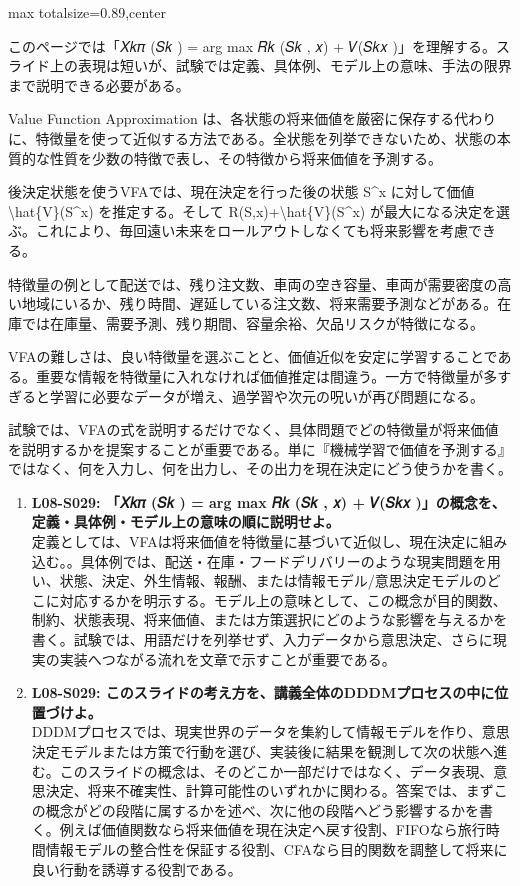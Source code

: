 \begin{minipage}[t]{0.58\textwidth}
\begin{adjustbox}{max totalsize={\textwidth}{0.89\textheight},center}
\begin{minipage}{\textwidth}\scriptsize
{}このページでは「𝑋𝑘𝜋 (𝑆𝑘 ) = arg max 𝑅𝑘 (𝑆𝑘 , 𝑥) + 𝑉(𝑆𝑘𝑥 )」を理解する。スライド上の表現は短いが、試験では定義、具体例、モデル上の意味、手法の限界まで説明できる必要がある。\par
Value Function Approximation は、各状態の将来価値を厳密に保存する代わりに、特徴量を使って近似する方法である。全状態を列挙できないため、状態の本質的な性質を少数の特徴で表し、その特徴から将来価値を予測する。\par
後決定状態を使うVFAでは、現在決定を行った後の状態 S\textasciicircum{}x に対して価値 \textbackslash{}hat\{V\}(S\textasciicircum{}x) を推定する。そして R(S,x)+\textbackslash{}hat\{V\}(S\textasciicircum{}x) が最大になる決定を選ぶ。これにより、毎回遠い未来をロールアウトしなくても将来影響を考慮できる。\par
特徴量の例として配送では、残り注文数、車両の空き容量、車両が需要密度の高い地域にいるか、残り時間、遅延している注文数、将来需要予測などがある。在庫では在庫量、需要予測、残り期間、容量余裕、欠品リスクが特徴になる。\par
VFAの難しさは、良い特徴量を選ぶことと、価値近似を安定に学習することである。重要な情報を特徴量に入れなければ価値推定は間違う。一方で特徴量が多すぎると学習に必要なデータが増え、過学習や次元の呪いが再び問題になる。\par
試験では、VFAの式を説明するだけでなく、具体問題でどの特徴量が将来価値を説明するかを提案することが重要である。単に『機械学習で価値を予測する』ではなく、何を入力し、何を出力し、その出力を現在決定にどう使うかを書く。\par{}\begin{enumerate}\item \textbf{L08-S029: 「𝑋𝑘𝜋 (𝑆𝑘 ) = arg max 𝑅𝑘 (𝑆𝑘 , 𝑥) + 𝑉(𝑆𝑘𝑥 )」の概念を、定義・具体例・モデル上の意味の順に説明せよ。}\\定義としては、VFAは将来価値を特徴量に基づいて近似し、現在決定に組み込む。。具体例では、配送・在庫・フードデリバリーのような現実問題を用い、状態、決定、外生情報、報酬、または情報モデル/意思決定モデルのどこに対応するかを明示する。モデル上の意味として、この概念が目的関数、制約、状態表現、将来価値、または方策選択にどのような影響を与えるかを書く。試験では、用語だけを列挙せず、入力データから意思決定、さらに現実の実装へつながる流れを文章で示すことが重要である。\item \textbf{L08-S029: このスライドの考え方を、講義全体のDDDMプロセスの中に位置づけよ。}\\DDDMプロセスでは、現実世界のデータを集約して情報モデルを作り、意思決定モデルまたは方策で行動を選び、実装後に結果を観測して次の状態へ進む。このスライドの概念は、そのどこか一部だけではなく、データ表現、意思決定、将来不確実性、計算可能性のいずれかに関わる。答案では、まずこの概念がどの段階に属するかを述べ、次に他の段階へどう影響するかを書く。例えば価値関数なら将来価値を現在決定へ戻す役割、FIFOなら旅行時間情報モデルの整合性を保証する役割、CFAなら目的関数を調整して将来に良い行動を誘導する役割である。\end{enumerate}

\end{minipage}
\end{adjustbox}
\end{minipage}
